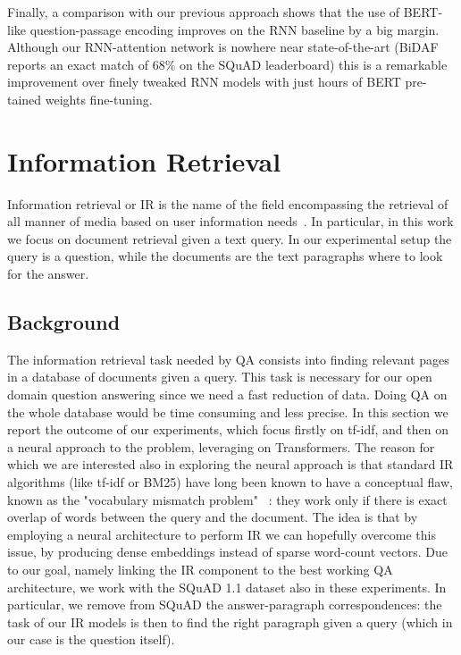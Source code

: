 \documentclass{article}
\begin{document}
Finally, a comparison with our previous approach shows that the use of BERT-like question-passage encoding improves on the RNN baseline by a big margin. Although our RNN-attention network is nowhere near state-of-the-art (BiDAF reports an exact match of 68\% on the SQuAD leaderboard) this is a remarkable improvement over finely tweaked RNN models with just hours of BERT pre-tained weights fine-tuning.



\section{Information Retrieval}
Information retrieval or IR is the name of the field encompassing the retrieval of all manner of media based on user information needs~\cite{Woods1978SemanticsAQ}. In particular, in this work we focus on document retrieval given a text query. In our experimental setup the query is a question, while the documents are the text paragraphs where to look for the answer.


\subsection{Background}
The information retrieval task needed by QA consists into finding relevant pages in a database of documents given a query. This task is necessary for our open domain question answering since we need a fast reduction of data. Doing QA on the whole database would be time consuming and less precise. 
In this section we report the outcome of our experiments, which focus firstly on tf-idf, and then on a neural approach to the problem, leveraging on Transformers. The reason for which we are interested also in exploring the neural approach is that standard IR algorithms (like tf-idf or BM25) have long been known to have a conceptual flaw, known as the "vocabulary mismatch problem" ~\cite{Woods1978SemanticsAQ}: they work only if there is exact overlap of words between the query and the document. The idea is that by employing a neural architecture to perform IR we can hopefully overcome this issue, by producing dense embeddings instead of sparse word-count vectors. 
Due to our goal, namely linking the IR component to the best working QA architecture, we work with the SQuAD 1.1 dataset also in these experiments. In particular, we remove from SQuAD the answer-paragraph correspondences: the task of our IR models is then to find the right paragraph given a query (which in our case is the question itself).
\end{document}
